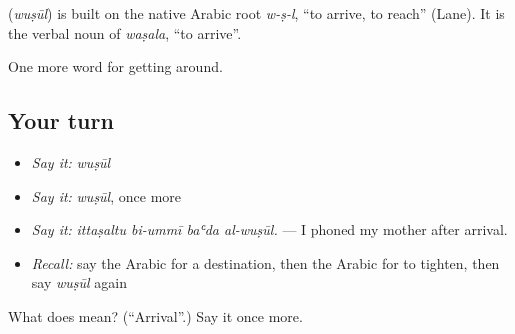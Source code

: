\begin{cousinweb}
\textbf{} (\emph{wuṣūl}) is built on the native Arabic root \emph{w-ṣ-l}, \textquotedblleft{}to arrive, to reach\textquotedblright{} (Lane). It is the verbal noun of \emph{waṣala}, \textquotedblleft{}to arrive\textquotedblright{}.
\end{cousinweb}

\begin{grammarlens}[title={What you've built}]
One more word for getting around.
\end{grammarlens}

\subsection*{Your turn}
\begin{itemize}
\raggedright
  \item \emph{Say it:} \emph{wuṣūl}
  \item \emph{Say it:} \emph{wuṣūl}, once more
  \item \emph{Say it:} \emph{ittaṣaltu bi-ummī baʿda al-wuṣūl.} — I phoned my mother after arrival.
  \item \emph{Recall:} say the Arabic for a destination, then the Arabic for to tighten, then say \emph{wuṣūl} again
\end{itemize}

\begin{tcolorbox}[breakable,colback=teal!4,colframe=teal!35!black,title={Before you move on}]
What does  mean? (\textquotedblleft{}Arrival\textquotedblright{}.) Say it once more.
\end{tcolorbox}

